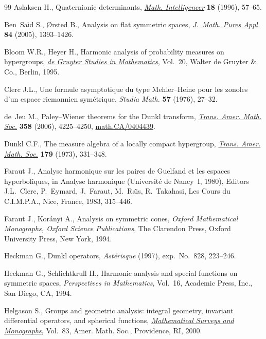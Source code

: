 \documentclass[11pt]{article}
\numberwithin{equation}{section}
\begin{document}
\begin{thebibliography}{99}
Aslaksen H., Quaternionic determinants, \href{http://dx.doi.org/10.1007/BF03024312}{\textit{Math. Intelligencer}}
  \textbf{18} (1996), 57--65.

Ben~Sa{\"{\i}}d S., {\O}rsted B., Analysis on f\/lat symmetric spaces,
  \href{http://dx.doi.org/10.1016/j.matpur.2005.01.006}{\textit{J.~Math. Pures Appl.}} \textbf{84} (2005), 1393--1426.

Bloom W.R., Heyer H., Harmonic analysis of probability measures on hypergroups,
  \href{http://dx.doi.org/10.1515/9783110877595}{\textit{de Gruyter Studies in Mathematics}}, Vol.~20, Walter de Gruyter \&
  Co., Berlin, 1995.

Clerc J.L., Une formule asymptotique du type {M}ehler--{H}eine pour les zonoles
  d'un espace riemannien sym\'etrique, \textit{Studia Math.} \textbf{57}
  (1976), 27--32.

de~Jeu M., Paley--{W}iener theorems for the {D}unkl transform, \href{http://dx.doi.org/10.1090/S0002-9947-06-03960-2}{\textit{Trans.
  Amer. Math. Soc.}} \textbf{358} (2006), 4225--4250, \href{http://arxiv.org/abs/math.CA/0404439}{math.CA/0404439}.

Dunkl C.F., The measure algebra of a locally compact hypergroup, \href{http://dx.doi.org/10.1090/S0002-9947-1973-0320635-2}{\textit{Trans.
  Amer. Math. Soc.}} \textbf{179} (1973), 331--348.

Faraut J., Analyse harmonique sur les paires de Guelfand et les espaces
  hyperboliques, in Analyse harmonique (Universit\'e de Nancy~I, 1980), Editors
  J.L.~Clerc, P.~Eymard, J.~Faraut, M.~Ra\"{\i}s, R.~Takahasi, Les Cours du
  C.I.M.P.A., Nice, France, 1983, 315--446.

Faraut J., Kor{\'a}nyi A., Analysis on symmetric cones, \textit{Oxford Mathematical
  Monographs, Oxford Science Publications}, The Clarendon Press, Oxford
  University Press, New York, 1994.

Heckman G., Dunkl operators, \textit{Ast\'erisque}  (1997), exp.~No.~828,
  223--246.

Heckman G., Schlichtkrull H., Harmonic analysis and special functions on
  symmetric spaces, \textit{Perspectives in Mathematics}, Vol.~16, Academic
  Press, Inc., San Diego, CA, 1994.



Helgason S., Groups and geometric analysis: integral geometry, invariant
  dif\/ferential operators, and spherical functions, \href{http://dx.doi.org/10.1090/surv/083}{\textit{Mathematical Surveys
  and Monographs}}, Vol.~83, Amer. Math. Soc., Providence, RI, 2000.


\end{thebibliography}
\end{document}

